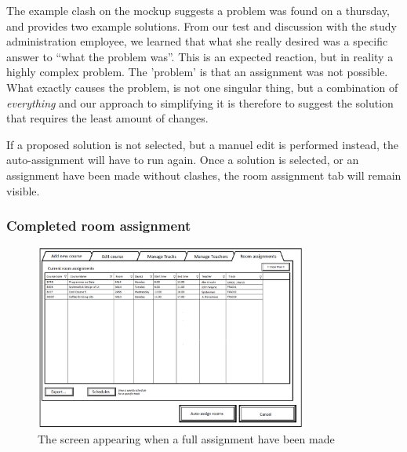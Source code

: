 The example clash on the mockup suggests a problem was found on a thursday, and provides two example solutions. From our test and discussion with the study administration employee, we learned that what she really desired was a specific answer to ``what the problem was''. This is an expected reaction, but in reality a highly complex problem. The 'problem' is that an assignment was not possible. What exactly causes the problem, is not one singular thing, but a combination of \emph{everything} and our approach to simplifying it is therefore to suggest the solution that requires the least amount of changes.

If a proposed solution is not selected, but a manuel edit is performed instead, the auto-assignment will have to run again.
Once a solution is selected, or an assignment have been made without clashes, the room assignment tab will remain visible.

\subsubsection{Completed room assignment}
\begin{figure}[htb]
\begin{center}
\leavevmode
\includegraphics[width=0.8\textwidth]{images/courseplan2_Room_Assignments}
\end{center}
\caption{The screen appearing when a full assignment have been made}
\label{fig:courseplan2_assign}
\end{figure}

